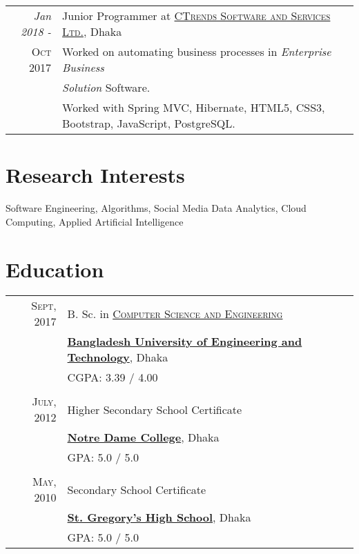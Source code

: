 \documentclass[a4paper,10pt]{article}
\begin{document}
\begin{tabular}{r|p{11cm}}
 \emph{Jan 2018 -} & Junior Programmer at \href{http://www.ctrends-software.com}{\textsc{CTrends Software and Services Ltd.}}, Dhaka \\\textsc{Oct 2017} & Worked on automating business processes in \emph{Enterprise Business} \\ & \emph{Solution} Software.\\
 & Worked with Spring MVC, Hibernate, HTML5, CSS3, Bootstrap, JavaScript, PostgreSQL.
\end{tabular}

\section{Research Interests}
Software Engineering, Algorithms,  Social Media Data Analytics, Cloud Computing, Applied Artificial Intelligence

\section{Education}
\begin{tabular}{rl} 
 \textsc{Sept}, 2017 & B. Sc. in \href{https://cse.buet.ac.bd/}{\textsc{Computer Science and Engineering}} \\
 & \href{http://www.buet.ac.bd/}{\textbf{Bangladesh University of Engineering and Technology}}, Dhaka \\
& \normalsize \textsc{CGPA}: 3.39 / 4.00 \\

&\\

\textsc{July}, 2012 & Higher Secondary School Certificate \\
 & \href{http://www.notredamecollege-dhaka.com/}{\textbf{Notre Dame College}}, Dhaka \\
 & \normalsize \textsc{GPA}: 5.0 / 5.0 \\
&\\

\textsc{May}, 2010 & Secondary School Certificate \\
 & \href{http://www.sghsbd.com/}{\textbf{St. Gregory's High School}}, Dhaka \\
 & \normalsize \textsc{GPA}: 5.0 / 5.0 \\

\end{tabular}
\end{document}
